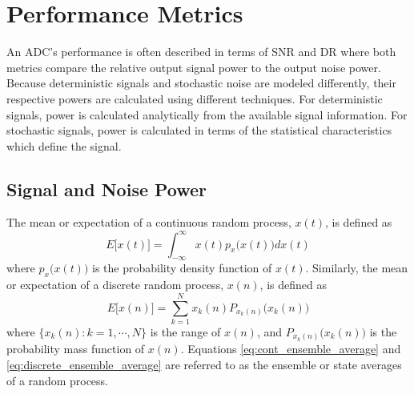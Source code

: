 \section{Performance Metrics}
An ADC's performance is often described in terms of SNR and DR where both
metrics compare the relative output signal power to the output noise power. Because
deterministic signals and stochastic noise are modeled differently, their respective
powers are calculated using different techniques. For deterministic signals,
power is calculated analytically from the available signal information. For stochastic
signals, power is calculated in terms of the statistical characteristics which define the
signal.

\subsection{Signal and Noise Power}
The mean or expectation of a continuous random process, $x(t)$, is defined as
\begin{equation}\label{eq:cont_ensemble_average}
 E\bigl[x(t)\bigr] = \int_{-\infty}^{\infty}{x(t) p_x\bigl(x\left(t\right)\bigr)dx(t)}
\end{equation}
where $p_x\bigl(x\left(t\right)\bigr)$ is the probability density function of $x(t)$.
Similarly, the mean or expectation of a discrete random process, $x(n)$, is defined as
\begin{equation}\label{eq:discrete_ensemble_average}
 E\bigl[x(n)\bigr] = \sum_{k=1}^{N}{x_k(n)P_{x_k(n)}\bigl(x_k(n)\bigr)}
\end{equation}
where $\{x_k(n): k=1,\cdots,N\}$ is the range of $x(n)$, and
$P_{x_k(n)}\bigl(x_k(n)\bigr)$ is the probability mass function of $x(n)$. Equations
\eqref{eq:cont_ensemble_average} and \eqref{eq:discrete_ensemble_average} are
referred to as the ensemble or state averages of a random process.


